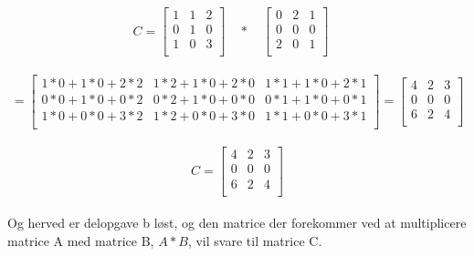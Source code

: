 \documentclass[20pt]{article}
\begin{document}
	\begin{equation}
		C = 
		\begin{bmatrix} 
			1 & 1 & 2 \\
			0 & 1 & 0 \\
			1 & 0 & 3 \\
		\end{bmatrix}
		\quad * \quad
		\begin{bmatrix} 
			0 & 2 & 1 \\
			0 & 0 & 0 \\
			2 & 0 & 1 \\
		\end{bmatrix}
		\quad	
	\end{equation}
	\\ 
	\begin{equation}
		= 
		\begin{bmatrix} 
			1*0+1*0+2*2 & 1*2+1*0+2*0 & 1*1+1*0+2*1 \\
			0*0+1*0+0*2 & 0*2+1*0+0*0 & 0*1+1*0+0*1 \\
			1*0+0*0+3*2 & 1*2+0*0+3*0 & 1*1+0*0+3*1 \\
		\end{bmatrix}
		= 
		\begin{bmatrix} 
			4 & 2 & 3 \\
			0 & 0 & 0 \\
			6 & 2 & 4 \\
		\end{bmatrix}
	\end{equation}
	\\
	\begin{equation}
		C = 
		\begin{bmatrix} 
			4 & 2 & 3 \\
			0 & 0 & 0 \\
			6 & 2 & 4 \\
		\end{bmatrix}
	\end{equation}
	\\
	Og herved er delopgave b løst, og den matrice der forekommer ved at multiplicere matrice A med matrice B, \(A*B\), vil svare til matrice C.
	\newpage
		
\end{document}
